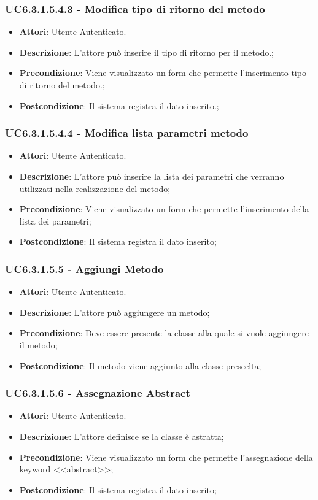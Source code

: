 \subsubsection{UC6.3.1.5.4.3 - Modifica tipo di ritorno del metodo} 
\label{sssec:UC6.3.1.5.4.3} 
\begin{itemize} 
\item \textbf{Attori}: Utente Autenticato.
\item \textbf{Descrizione}: L'attore può inserire il tipo di ritorno per il metodo.;
\item \textbf{Precondizione}: Viene visualizzato un form che permette l'inserimento tipo di ritorno del metodo.;
\item \textbf{Postcondizione}: Il sistema registra il dato inserito.;
\end{itemize} 
\subsubsection{UC6.3.1.5.4.4 - Modifica lista parametri metodo} 
\label{sssec:UC6.3.1.5.4.4} 
\begin{itemize} 
\item \textbf{Attori}: Utente Autenticato.
\item \textbf{Descrizione}: L'attore può inserire la lista dei parametri che verranno utilizzati nella realizzazione del metodo;
\item \textbf{Precondizione}: Viene visualizzato un form che permette l'inserimento della lista dei parametri;
\item \textbf{Postcondizione}: Il sistema registra il dato inserito;
\end{itemize} 
\subsubsection{UC6.3.1.5.5 - Aggiungi Metodo} 
\label{sssec:UC6.3.1.5.5} 
\begin{itemize} 
\item \textbf{Attori}: Utente Autenticato.
\item \textbf{Descrizione}: L'attore può aggiungere un metodo;
\item \textbf{Precondizione}: Deve essere presente la classe alla quale si vuole aggiungere il metodo;
\item \textbf{Postcondizione}: Il metodo viene aggiunto alla classe prescelta;
\end{itemize} 
\subsubsection{UC6.3.1.5.6 - Assegnazione Abstract} 
\label{sssec:UC6.3.1.5.6} 
\begin{itemize} 
\item \textbf{Attori}: Utente Autenticato.
\item \textbf{Descrizione}: L'attore definisce se la classe è astratta;
\item \textbf{Precondizione}: Viene visualizzato un form che permette l'assegnazione della keyword <<abstract>>;
\item \textbf{Postcondizione}: Il sistema registra il dato inserito;
\end{itemize} 
